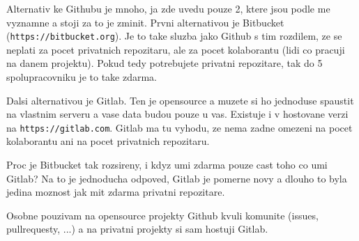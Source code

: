 Alternativ ke Githubu je mnoho, ja zde uvedu pouze 2, ktere jsou podle me vyznamne a stoji za to je zminit. Prvni alternativou je Bitbucket (\lstinline|https://bitbucket.org|). Je to take sluzba jako Github s tim rozdilem, ze se neplati za pocet privatnich repozitaru, ale za pocet kolaborantu (lidi co pracuji na danem projektu). Pokud tedy potrebujete privatni repozitare, tak do 5 spolupracovniku je to take zdarma.

Dalsi alternativou je Gitlab. Ten je opensource a muzete si ho jednoduse spaustit na vlastnim serveru a vase data budou pouze u vas. Existuje i v hostovane verzi na \lstinline|https://gitlab.com|. Gitlab ma tu vyhodu, ze nema zadne omezeni na pocet kolaborantu ani na pocet privatnich repozitaru.

Proc je Bitbucket tak rozsireny, i kdyz umi zdarma pouze cast toho co umi Gitlab? Na to je jednoducha odpoved, Gitlab je pomerne novy a dlouho to byla jedina moznost jak mit zdarma privatni repozitare.

Osobne pouzivam na opensource projekty Github kvuli komunite (issues, pullrequesty, ...) a na privatni projekty si sam hostuji Gitlab.

